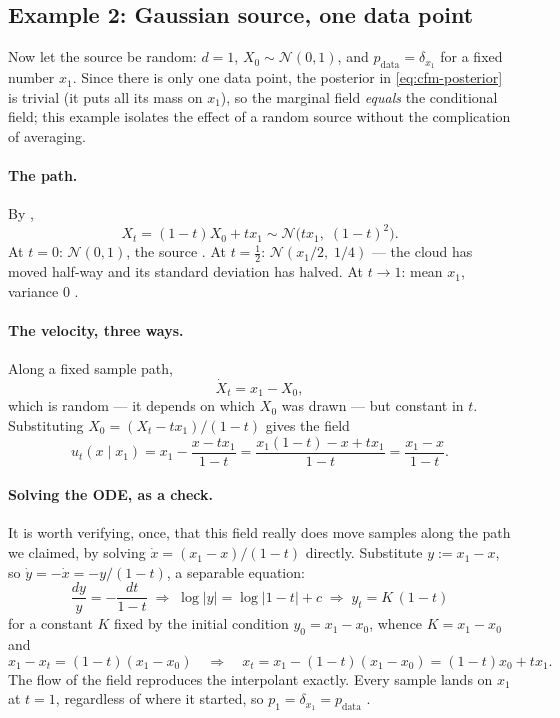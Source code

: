 \documentclass[11pt,a4paper]{report}
\theoremstyle{definition}
\theoremstyle{remark}
\begin{document}
\subsection{Example 2: Gaussian source, one data point}
\label{sec:fm-1d-gaussian}

Now let the source be random: $d=1$, $X_0\sim\mathcal N(0,1)$, and
$p_{\mathrm{data}}=\delta_{x_1}$ for a fixed number $x_1$. Since there is
only one data point, the posterior in \eqref{eq:cfm-posterior} is trivial
(it puts all its mass on $x_1$), so the marginal field \emph{equals} the
conditional field; this example isolates the effect of a random source
without the complication of averaging.

\paragraph{The path.} By ,
\[
X_t = (1-t)X_0 + tx_1
\sim \mathcal N\bigl(tx_1,\;(1-t)^2\bigr) .
\]
At $t=0$: $\mathcal N(0,1)$, the source \checkmark. At $t=\tfrac12$:
$\mathcal N(x_1/2,\;1/4)$ --- the cloud has moved half-way and its standard
deviation has halved. At $t\to1$: mean $x_1$, variance $0$ \checkmark.

\paragraph{The velocity, three ways.} Along a fixed sample path,
\[
\dot X_t = x_1 - X_0 ,
\]
which is random --- it depends on which $X_0$ was drawn --- but constant in
$t$. Substituting $X_0=(X_t-tx_1)/(1-t)$ gives the field
\[
u_t(x\mid x_1)
= x_1 - \frac{x-tx_1}{1-t}
= \frac{x_1(1-t) - x + tx_1}{1-t}
= \frac{x_1-x}{1-t} .
\]

\paragraph{Solving the ODE, as a check.} It is worth verifying, once, that
this field really does move samples along the path we claimed, by solving
$\dot x = (x_1-x)/(1-t)$ directly. Substitute $y := x_1 - x$, so
$\dot y = -\dot x = -y/(1-t)$, a separable equation:
\[
\frac{dy}{y} = -\frac{dt}{1-t}
\;\Longrightarrow\;
\log|y| = \log|1-t| + c
\;\Longrightarrow\;
y_t = K\,(1-t)
\]
for a constant $K$ fixed by the initial condition $y_0 = x_1-x_0$, whence
$K = x_1-x_0$ and
\[
x_1 - x_t = (1-t)(x_1-x_0)
\quad\Longrightarrow\quad
x_t = x_1 - (1-t)(x_1-x_0) = (1-t)x_0 + tx_1 .
\]
The flow of the field reproduces the interpolant exactly. Every sample
lands on $x_1$ at $t=1$, regardless of where it started, so
$p_1 = \delta_{x_1} = p_{\mathrm{data}}$ \checkmark.
\end{document}
